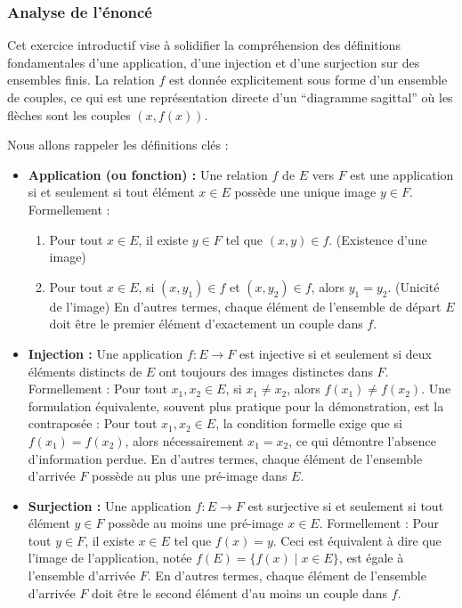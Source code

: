 \documentclass[12pt,a4paper]{report}
\providecommand{\tightlist}{%
  \setlength{\itemsep}{0pt}\setlength{\parskip}{0pt}}
\begin{document}
\subsubsection{Analyse de l'énoncé}\label{analyse-de-luxe9noncuxe9}

Cet exercice introductif vise à solidifier la compréhension des
définitions fondamentales d'une application, d'une injection et d'une
surjection sur des ensembles finis. La relation \(f\) est donnée
explicitement sous forme d'un ensemble de couples, ce qui est une
représentation directe d'un ``diagramme sagittal'' où les flèches sont
les couples \((x, f(x))\).

Nous allons rappeler les définitions clés :

\begin{itemize}
\item
  \textbf{Application (ou fonction) :} Une relation \(f\) de \(E\) vers
  \(F\) est une application si et seulement si tout élément \(x \in E\)
  possède une unique image \(y \in F\). Formellement :

  \begin{enumerate}
  \def\labelenumi{\arabic{enumi}.}
  \tightlist
  \item
    Pour tout \(x \in E\), il existe \(y \in F\) tel que
    \((x, y) \in f\). (Existence d'une image)
  \item
    Pour tout \(x \in E\), si \((x, y_1) \in f\) et \((x, y_2) \in f\),
    alors \(y_1 = y_2\). (Unicité de l'image) En d'autres termes, chaque
    élément de l'ensemble de départ \(E\) doit être le premier élément
    d'exactement un couple dans \(f\).
  \end{enumerate}
\item
  \textbf{Injection :} Une application \(f: E \to F\) est injective si
  et seulement si deux éléments distincts de \(E\) ont toujours des
  images distinctes dans \(F\). Formellement : Pour tout
  \(x_1, x_2 \in E\), si \(x_1 \neq x_2\), alors \(f(x_1) \neq f(x_2)\).
  Une formulation équivalente, souvent plus pratique pour la
  démonstration, est la contraposée : Pour tout \(x_1, x_2 \in E\), la
  condition formelle exige que si \(f(x_1) = f(x_2)\), alors
  nécessairement \(x_1 = x_2\), ce qui démontre l'absence d'information
  perdue. En d'autres termes, chaque élément de l'ensemble d'arrivée
  \(F\) possède au plus une pré-image dans \(E\).
\item
  \textbf{Surjection :} Une application \(f: E \to F\) est surjective si
  et seulement si tout élément \(y \in F\) possède au moins une
  pré-image \(x \in E\). Formellement : Pour tout \(y \in F\), il existe
  \(x \in E\) tel que \(f(x) = y\). Ceci est équivalent à dire que
  l'image de l'application, notée \(f(E) = \{f(x) \mid x \in E\}\), est
  égale à l'ensemble d'arrivée \(F\). En d'autres termes, chaque élément
  de l'ensemble d'arrivée \(F\) doit être le second élément d'au moins
  un couple dans \(f\).
\end{itemize}
\end{document}
